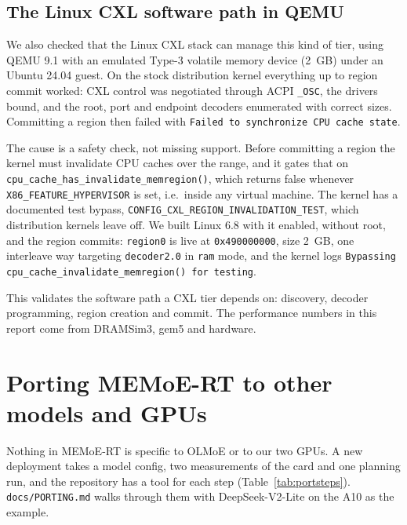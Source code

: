 \documentclass[10pt,a4paper]{article}
\begin{document}
\subsection{The Linux CXL software path in QEMU}
\label{sec:qemu}

We also checked that the Linux CXL stack can manage this kind of tier, using QEMU
9.1 with an emulated Type-3 volatile memory device (2~GB) under an Ubuntu 24.04
guest. On the stock distribution kernel everything up to region commit worked:
CXL control was negotiated through ACPI \texttt{\_OSC}, the drivers bound, and the
root, port and endpoint decoders enumerated with correct sizes. Committing a region
then failed with \texttt{Failed to synchronize CPU cache state}.

\begin{sloppypar}
The cause is a safety check, not missing support. Before committing a region the
kernel must invalidate CPU caches over the range, and it gates that on
\texttt{cpu\_cache\_has\_invalidate\_memregion()}, which returns false whenever
\texttt{X86\_FEATURE\_HYPERVISOR} is set, i.e.\ inside any virtual machine. The
kernel has a documented test bypass, \texttt{CONFIG\_CXL\_REGION\_INVALIDATION\_TEST},
which distribution kernels leave off. We built Linux 6.8 with it enabled, without
root, and the region commits: \texttt{region0} is live at \texttt{0x490000000},
size 2~GB, one interleave way targeting \texttt{decoder2.0} in \texttt{ram} mode,
and the kernel logs \texttt{Bypassing cpu\_cache\_invalidate\_memregion() for
testing}.
\end{sloppypar}

This validates the software path a CXL tier depends on: discovery, decoder
programming, region creation and commit. The performance numbers in this report
come from DRAMSim3, gem5 and hardware.

\section{Porting MEMoE-RT to other models and GPUs}
\label{sec:porting}

Nothing in MEMoE-RT is specific to OLMoE or to our two GPUs. A new deployment takes
a model config, two measurements of the card and one planning run, and the
repository has a tool for each step (Table~\ref{tab:portsteps}). \texttt{docs/PORTING.md}
walks through them with DeepSeek-V2-Lite on the A10 as the example.
\end{document}
